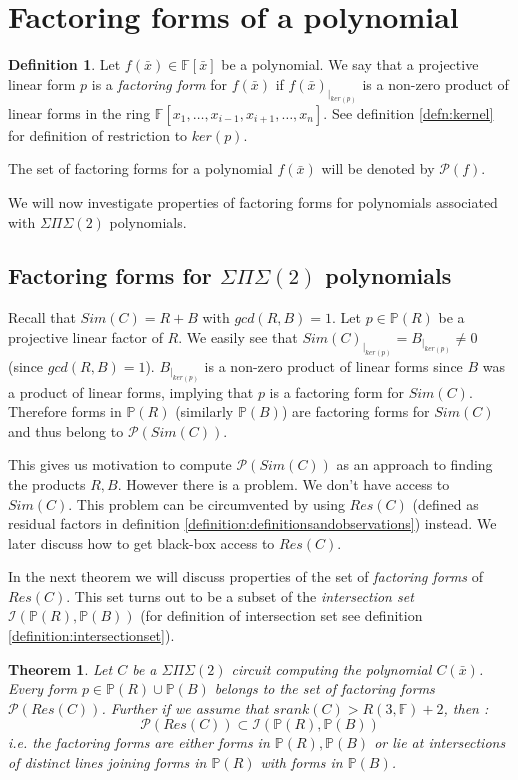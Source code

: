 \documentclass[12pt]{caltech_thesis}
\theoremstyle{plain}
\newtheorem{theorem}{Theorem}
\theoremstyle{definition}
\newtheorem{definition}{Definition}
\newcommand{\F}{\mathbb{F}}
\newcommand{\MP}{\mathcal{P}}
\newcommand{\MI}{\mathcal{I}}
\newcommand{\PP}{\mathbb{P}}
\newcommand{\B}[1]{\bar{#1}}
\begin{document}
\section{Factoring forms of a polynomial}\label{section:factorsps2}


\begin{definition}\label{definition:factoringform}
 Let $f(\B{x})\in \F[\B{x}]$ be a polynomial. We say that a projective linear form $p$ is a \emph{factoring form} for 
 $f(\B{x})$ if $f(\B{x})_{|_{ker(p)}}$  
 is a non-zero product of linear forms in the ring $\F[x_1,\ldots,x_{i-1},x_{i+1},\ldots,x_n]$. See definition \ref{defn:kernel}
 for definition of restriction to $ker(p)$.
 
 The set of factoring forms for a polynomial $f(\B{x})$ will be denoted
 by $\MP(f)$.
\end{definition}

 We will now investigate
properties of factoring forms for polynomials associated with $\Sigma\Pi\Sigma(2)$ polynomials. 


\subsection{Factoring forms for $\Sigma\Pi\Sigma(2)$ polynomials}\label{subsection:factorsps2}

Recall that $Sim(C) = R + B$ with $gcd(R,B)=1$. Let $p\in \PP(R)$ be a projective linear factor of $R$. We easily see that
$Sim(C)_{|_{ker(p)}} = B_{|_{ker(p)}} \neq 0$ (since $gcd(R,B)=1$). $B_{|_{ker(p)}}$ is a non-zero product of linear forms
since $B$ was a product of linear forms, implying that $p$ is a factoring form for $Sim(C)$. Therefore forms in $\PP(R)$
(similarly $\PP(B)$) are factoring forms for $Sim(C)$ and thus belong to $\MP(Sim(C))$. 

This gives us motivation to compute $\MP(Sim(C))$ as
an approach to finding the products $R,B$. However
there is a problem. We don't have access to $Sim(C)$. This problem can be circumvented by using  
$Res(C)$ (defined as residual factors in definition \ref{definition:definitionsandobservations}) instead. 
We later discuss how to get black-box access to $Res(C)$.

In the next theorem we will discuss properties of the set of \emph{factoring forms} of $Res(C)$.
This set turns out to be a subset of the \emph{intersection set} $\MI(\PP(R),\PP(B))$ (for definition of intersection
set see definition \ref{definition:intersectionset}).


\begin{theorem}\label{theorem:candidatestructure}
 Let $C$ be a $\Sigma\Pi\Sigma(2)$ circuit computing the polynomial $C(\B{x})$. Every form $p\in \PP(R)\cup\PP(B)$ belongs to the set of 
 factoring forms $\MP(Res(C))$. Further if we  assume that $srank(C) > R(3,\F)+2$, then : 
\[
 \MP(Res(C))\subset \MI(\PP(R),\PP(B))
\]
i.e. the factoring forms are either forms in $\PP(R),\PP(B)$ or lie at intersections of distinct lines joining
forms in $\PP(R)$ with forms in $\PP(B)$. 
\end{theorem}
\end{document}
